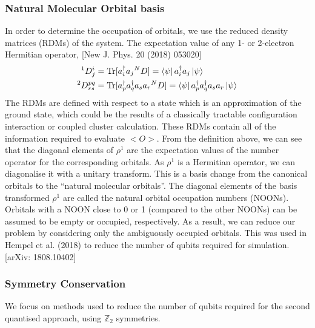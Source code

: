 \documentclass[11pt, oneside]{article}   	%
\begin{document}
\subsubsection{Natural Molecular Orbital basis}
In order to determine the occupation of orbitals, we use the reduced density matrices (RDMs) of the system. 
The expectation value of any 1- or 2-electron Hermitian operator, [New J. Phys. 20 (2018) 053020]
\begin{align}
{}^1 D^i_j&= \mathrm{Tr} [a^{\dagger}_i a_j {}^N D] = \bra{\psi} a^{\dagger}_i a_j \ket{\psi} \\
{}^2 D^{pq}_{rs} &= \mathrm{Tr} [a^{\dagger}_p a^{\dagger}_q a_s a_r  {}^N D] = \bra{\psi} a^{\dagger}_p a^{\dagger}_q a_s a_r \ket{\psi}
\end{align}
The RDMs are defined with respect to a state which is an approximation of the ground state, which could be the results of a classically tractable configuration interaction or coupled cluster calculation. 
These RDMs contain all of the information required to evaluate $<O>$. 
From the definition above, we can see that the diagonal elements of $\rho^1$ are the expectation values of the number operator for the corresponding orbitals. 
As $\rho^1$ is a Hermitian operator, we can diagonalise it with a unitary transform. 
This is a basis change from the canonical orbitals to the ``natural molecular orbitals''. 
The diagonal elements of the basis transformed $\rho^1$ are called the natural orbital occupation numbers (NOONs). 
Orbitals with a NOON close to 0 or 1 (compared to the other NOONs) can be assumed to be empty or occupied, respectively. 
As a result, we can reduce our problem by considering only the ambiguously occupied orbitals. 
This was used in Hempel et al. (2018) to reduce the number of qubits required for simulation. 
[arXiv: 1808.10402]

\subsubsection{Symmetry Conservation}
We focus on methods used to reduce the number of qubits required for the second quantised approach, using $\mathbb{Z}_2$ symmetries.
\end{document}
